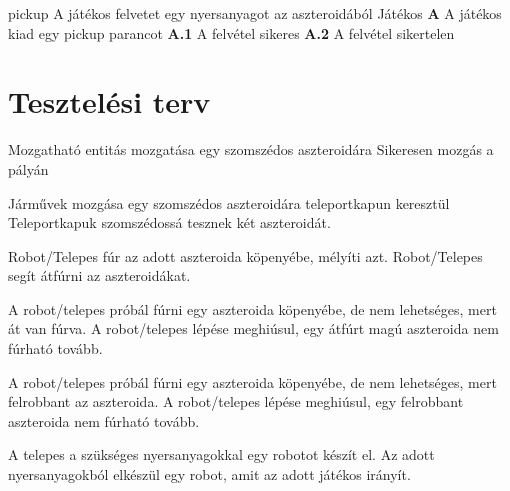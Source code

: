 \documentclass[../../projlab]{subfiles}
\begin{document}
\begin{use-case}
    {pickup}
    {A játékos felvetet egy nyersanyagot az aszteroidából}
    {Játékos} 
    \textbf{A} A játékos kiad egy pickup parancot \newline
    \textbf{A.1} A felvétel sikeres \newline
    \textbf{A.2} A felvétel sikertelen 
\end{use-case}


\section{Tesztelési terv}

{Mozgatható entitás mozgatása egy szomszédos aszteroidára}
{Sikeresen mozgás a pályán}

{Járművek mozgása egy szomszédos aszteroidára teleportkapun keresztül}
{Teleportkapuk szomszédossá tesznek két aszteroidát.}

{Robot/Telepes fúr az adott aszteroida köpenyébe, mélyíti azt.}
{Robot/Telepes segít átfúrni az aszteroidákat.}

{A robot/telepes próbál fúrni egy aszteroida köpenyébe, de nem lehetséges, mert át van fúrva.}
{A robot/telepes lépése meghiúsul, egy átfúrt magú aszteroida nem fúrható tovább. }

{A robot/telepes próbál fúrni egy aszteroida köpenyébe, de nem lehetséges, mert felrobbant az aszteroida.}
{A robot/telepes lépése meghiúsul, egy felrobbant aszteroida nem fúrható tovább. }

{A telepes a szükséges nyersanyagokkal egy robotot készít el. }
{Az adott nyersanyagokból elkészül egy robot, amit az adott játékos irányít. }
\end{document}
